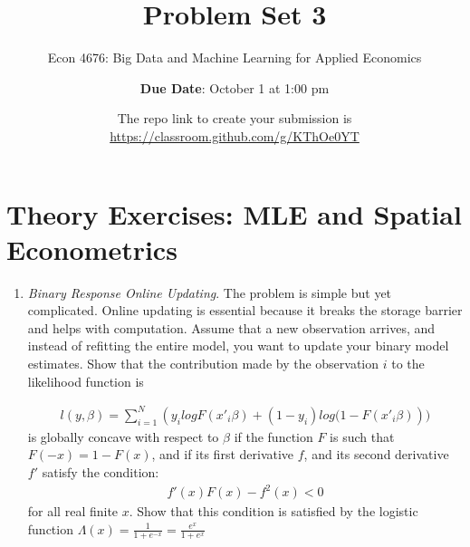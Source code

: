 \documentclass[12pt,onecolumn]{article}
\title{Problem Set 3}
\subtitle{Econ 4676: Big Data and Machine Learning for Applied Economics}
\author{{\bf Due Date}: October 1 at 1:00 pm}
\date{}
\date{The repo link to create your submission is \url{https://classroom.github.com/g/KThOe0YT}}
\begin{document}
\maketitle

\section{Theory Exercises: MLE and Spatial Econometrics}

\begin{enumerate}
  
  \item {\it Binary Response Online Updating}. The problem is simple but yet complicated. Online updating is essential because it breaks the storage barrier and helps with computation. Assume that a new observation arrives, and instead of refitting the entire model, you want to update your binary model estimates. Show that the contribution made by the observation $i$ to the likelihood function is

\begin{align}
l(y,\beta) = \sum_{i=1}^N \left( y_i log F(x'_i\beta) + (1-y_i) log (1-F(x'_i\beta)  \right))
\end{align}
  is globally concave with respect to $\beta$ if the function $F$ is such that $F(-x)=1-F(x)$, and if its first derivative $f$, and its second derivative $f'$ satisfy the condition:
  \begin{align}
  f'(x)F(x)-f^2(x)<0
  \end{align}
  for all real finite $x$. Show that this condition is satisfied by the logistic function $\Lambda(x)=\frac{1}{1+e^{-x}}=\frac{e^{x}}{1+e^{x}}$


\end{enumerate}
\end{document}
